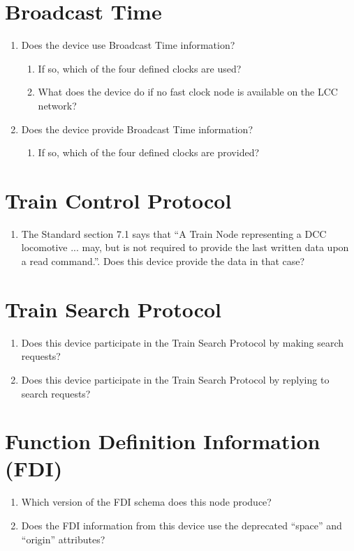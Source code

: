 \section{Broadcast Time}
    \begin{enumerate}
        \item Does the device use Broadcast Time information?
            \begin{enumerate}
                \item If so, which of the four defined clocks are used?
                \item What does the device do if no fast clock node is available
                    on the LCC network?
            \end{enumerate}
        \item Does the device provide Broadcast Time information?
            \begin{enumerate}
                \item If so, which of the four defined clocks are provided?
            \end{enumerate}
        
    \end{enumerate}

\section{Train Control Protocol}
    \begin{enumerate}
        \item The Standard section 7.1 says that
            ``A Train Node representing a DCC locomotive ... may, 
            but is not required to provide the last written data upon a read command.''.
            Does this device provide the data in that case?
    \end{enumerate}

\section{Train Search Protocol}
    \begin{enumerate}
        \item Does this device participate in the Train Search Protocol
            by making search requests?
        \item Does this device participate in the Train Search Protocol
            by replying to search requests?
    \end{enumerate}

\section{Function Definition Information (FDI)}
    \begin{enumerate}
        \item Which version of the FDI schema does this node produce?
        \item Does the FDI information from this device use the 
            deprecated ``space'' and ``origin'' attributes?
    \end{enumerate}


  
